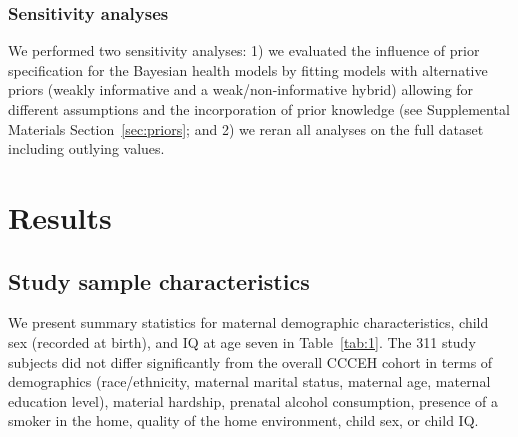 \subsubsection{Sensitivity analyses}
We performed two sensitivity analyses: 1) we evaluated the influence of prior specification for the Bayesian health models by fitting models with alternative priors (weakly informative and a weak/non-informative hybrid) allowing for different assumptions and the incorporation of prior knowledge (see Supplemental Materials Section~\ref{sec:priors}; and 2) we reran all analyses on the full dataset including outlying values.

\section{Results}
\subsection{Study sample characteristics}

We present summary statistics for maternal demographic characteristics, child sex (recorded at birth), and IQ at age seven in Table~\ref{tab:1}. The 311 study subjects did not differ significantly from the overall CCCEH cohort in terms of demographics (race/ethnicity, maternal marital status, maternal age, maternal education level), material hardship, prenatal alcohol consumption, presence of a smoker in the home, quality of the home environment, child sex, or child IQ. \\

